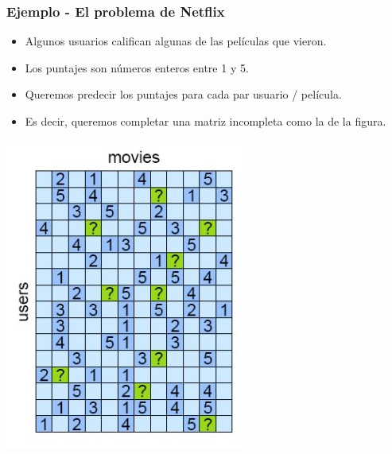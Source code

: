 \documentclass[aspectratio=169,12pt,spanish]{beamer}
\begin{document}
\begin{frame}
\frametitle{Ejemplo - El problema de Netflix}

\begin{minipage}[t]{0.65\textwidth}
\begin{itemize}
\item Algunos usuarios califican algunas de las películas que vieron.
\item Los puntajes son números enteros entre 1 y 5.
\item Queremos predecir los puntajes para cada par usuario / película.
\item Es decir, queremos completar una matriz incompleta como la de la figura.
\end{itemize}
\end{minipage}
\begin{minipage}[t]{0.3\textwidth}
\begin{center}
\includegraphics[scale=.6]{rank_netflix.png}
\end{center}
\end{minipage}



\end{frame}


\end{document}
